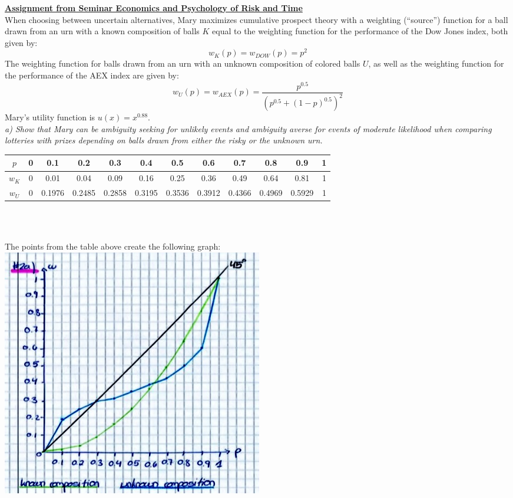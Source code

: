 \documentclass{article}
\begin{document}
\textbf{\underline{Assignment from Seminar Economics and Psychology of Risk and Time}}\\

When choosing between uncertain alternatives, Mary maximizes cumulative prospect theory with a weighting (“source”) function for a ball drawn from an urn with a known composition of balls $K$ equal to the weighting function for the performance of the Dow Jones index, both given by: $$w_K(p) = w_{DOW}(p) = p^2$$
The weighting function for balls drawn from an urn with an unknown composition of colored balls $U$, as well as the weighting function for the performance of the AEX index are given by: $$w_U(p) = w_{AEX}(p) = \frac{p^{0.5}}{(p^{0.5}+(1-p)^{0.5})^2}$$ 
Mary’s utility function is $u(x) = x^{0.88}$.\\

\textit{a) Show that Mary can be ambiguity seeking for unlikely events and ambiguity averse for events of moderate likelihood when comparing lotteries with prizes depending on balls drawn from either the risky or the unknown urn.}\\

\footnotesize\begin{tabular}{|c|c|c|c|c|c|c|c|c|c|c|c|} \hline
	$p$		&0	&0.1	&0.2	&0.3	&0.4	&0.5	&0.6	&0.7	&0.8	&0.9	&1\\ \hline
	$w_K$	&0	&0.01	&0.04	&0.09	&0.16	&0.25	&0.36	&0.49	&0.64	&0.81	&1\\ \hline
	$w_U$	&0	&0.1976	&0.2485	&0.2858	&0.3195	&0.3536	&0.3912	&0.4366	&0.4969	&0.5929	&1\\ \hline
\end{tabular}\\\\

\begin{center}
The points from the table above create the following graph:\\

\includegraphics[scale=0.75]{image.jpg}\\
\end{center}
\end{document}
